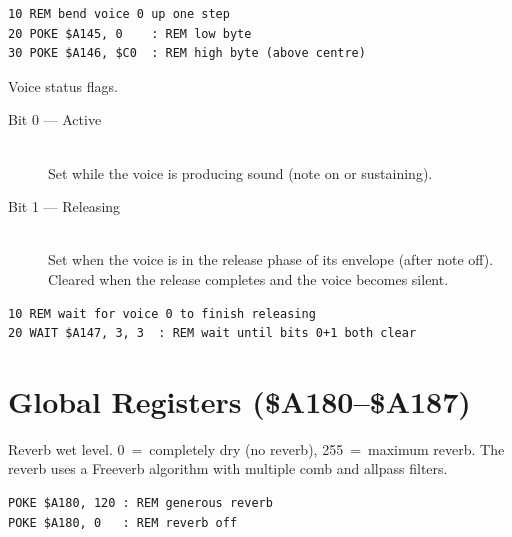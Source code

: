 \begin{lstlisting}
10 REM bend voice 0 up one step
20 POKE $A145, 0    : REM low byte
30 POKE $A146, $C0  : REM high byte (above centre)
\end{lstlisting}



Voice status flags.


\begin{description}
  \item[Bit 0 --- Active]\hfill\\
    Set while the voice is producing sound (note on or sustaining).
  \item[Bit 1 --- Releasing]\hfill\\
    Set when the voice is in the release phase of its envelope (after note off).
    Cleared when the release completes and the voice becomes silent.
\end{description}

\begin{lstlisting}
10 REM wait for voice 0 to finish releasing
20 WAIT $A147, 3, 3  : REM wait until bits 0+1 both clear
\end{lstlisting}


\section{Global Registers (\$A180--\$A187)}
\label{sec:wts-global}



Reverb wet level.  0~=~completely dry (no reverb), 255~=~maximum reverb.  The
reverb uses a Freeverb algorithm with multiple comb and allpass filters.

\begin{lstlisting}
POKE $A180, 120 : REM generous reverb
POKE $A180, 0   : REM reverb off
\end{lstlisting}


